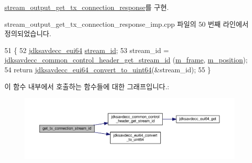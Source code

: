 \hyperlink{classavdecc__lib_1_1stream__output__get__tx__connection__response_a41e8408f2d3675cf07e20f804cacbd4e}{stream\+\_\+output\+\_\+get\+\_\+tx\+\_\+connection\+\_\+response}를 구현.



stream\+\_\+output\+\_\+get\+\_\+tx\+\_\+connection\+\_\+response\+\_\+imp.\+cpp 파일의 50 번째 라인에서 정의되었습니다.


\begin{DoxyCode}
51 \{
52     \hyperlink{structjdksavdecc__eui64}{jdksavdecc\_eui64} \hyperlink{avtp_8h_af5af7b461263e29ceb91a8d3a8bc2c97}{stream\_id};
53     stream\_id = \hyperlink{group__jdksavdecc__avtp__common__control__header_ga99181000ee374936c8518f657fa9f5cd}{jdksavdecc\_common\_control\_header\_get\_stream\_id}
      (\hyperlink{classavdecc__lib_1_1stream__output__get__tx__connection__response__imp_a50417969cf438e7c8d698726bbbe2ff9}{m\_frame}, \hyperlink{classavdecc__lib_1_1stream__output__get__tx__connection__response__imp_af5e691c4a8a0feb07f48440b321206cd}{m\_position});
54     \textcolor{keywordflow}{return} \hyperlink{group__eui64_ga1c9a3634faa4bec90dea5a52e691bf63}{jdksavdecc\_eui64\_convert\_to\_uint64}(&stream\_id);
55 \}
\end{DoxyCode}


이 함수 내부에서 호출하는 함수들에 대한 그래프입니다.\+:
\nopagebreak
\begin{figure}[H]
\begin{center}
\leavevmode
\includegraphics[width=350pt]{classavdecc__lib_1_1stream__output__get__tx__connection__response__imp_a75bcc3c5ff68a87805a82bcd9ee5b4da_cgraph}
\end{center}
\end{figure}


